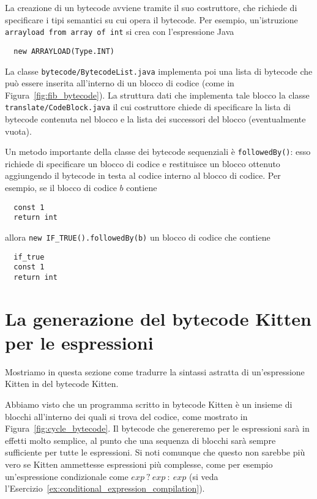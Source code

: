 La creazione di un bytecode avviene tramite il suo costruttore, che
richiede di specificare i tipi semantici su cui opera il bytecode.
Per esempio, un'istruzione \texttt{arrayload from array of int} si
crea con l'espressione Java
%
\begin{verbatim}
  new ARRAYLOAD(Type.INT)
\end{verbatim}
%
La classe \texttt{bytecode/BytecodeList.java} implementa poi una lista
di bytecode che pu\`o essere inserita all'interno di un blocco di codice
(come in Figura~\ref{fig:fib_bytecode}). La struttura dati che implementa
tale blocco \e la classe \texttt{translate/CodeBlock.java} il cui costruttore
chiede di specificare la lista di bytecode contenuta nel blocco e la lista
dei successori del blocco (eventualmente vuota).

Un metodo importante della classe dei bytecode sequenziali \`e
\texttt{followedBy()}: esso richiede di specificare un blocco di codice
e restituisce un blocco ottenuto aggiungendo il bytecode in testa
al codice interno al blocco di codice. Per esempio, se il blocco di
codice $b$ contiene
%
\begin{verbatim}
  const 1
  return int
\end{verbatim}
%
allora \texttt{new IF\_TRUE().followedBy(b)} \e un blocco di codice che
contiene
%
\begin{verbatim}
  if_true
  const 1
  return int
\end{verbatim}
%
\section{La generazione del bytecode Kitten per le espressioni}
  \label{sec:expressions_bytecode_generation}
%
Mostriamo in questa sezione come tradurre
la sintassi astratta di un'espressione Kitten in del bytecode Kitten.

Abbiamo visto che un programma scritto in bytecode Kitten \`e un insieme
di blocchi all'interno dei quali si trova del codice,
come mostrato in Figura~\ref{fig:cycle_bytecode}.
Il bytecode che genereremo per le espressioni sar\`a in effetti molto
semplice, al punto che una sequenza di blocchi sar\`a
sempre sufficiente per tutte le espressioni. Si noti comunque che questo
non sarebbe pi\`u vero se Kitten ammettesse espressioni pi\`u
complesse, come per esempio un'espressione condizionale come
$\mathit{exp}\ \mathtt{?}\ \mathit{exp}\ \mathtt{:}\ \mathit{exp}$
(si veda l'Esercizio~\ref{ex:conditional_expression_compilation}).

